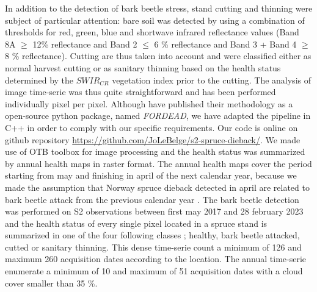 \documentclass[3p,procedia]{elsarticle}
\begin{document}
In addition to the detection of bark beetle stress, stand cutting and thinning were subject of particular attention: 
bare soil was detected by using a combination of thresholds for red, green, blue and shortwave infrared reflectance values (Band 8A $\geq$ 12\% reflectance and Band 2 $\leq$ 6 \% reflectance and Band 3 + Band 4 $\geq$ 8 \% reflectance).
Cutting are thus taken into account and were classified either as normal harvest cutting or as sanitary thinning based on the health status determined by the $SWIR_{CR}$ vegetation index prior to the cutting.
The analysis of image time-serie was thus quite straightforward and has been performed individually pixel per pixel.
Although \cite{dutrieux_package_2021} have published their methodology as a open-source python package, named \textit{FORDEAD}, we have adapted the pipeline in C++ in order to comply with our specific requirements.
Our code is online on github repository \url{https://github.com/JoLeBelge/s2-spruce-dieback/}. 
We made use of OTB toolbox \citep{grizonnet_2017_OTB} for image processing and the health status was summarized by annual health maps in raster format.
The annual health maps cover the period starting from may and finishing in april of the next calendar year, because we made the assumption that Norway spruce dieback detected in april are related to bark beetle attack from the previous calendar year \citep{muller_features_2022}.
The bark beetle detection was performed on S2 observations between first may 2017 and 28 february 2023 and the health status of every single pixel located in a spruce stand is summarized in one of the four following classes ; healthy, bark beetle attacked, cutted or sanitary thinning.
This dense time-serie count a minimum of 126 and maximum 260 acquisition dates according to the location. 
The annual time-serie enumerate a minimum of 10 and maximum of 51 acquisition dates with a cloud cover smaller than 35 \%.
\end{document}
